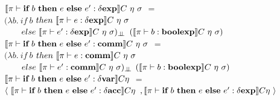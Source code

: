 $\llbracket  \pi \vdash \textbf{if} \ b \ \textbf{then} \ e \ \textbf{else} \ e': \delta \textbf{exp} \rrbracket C \ \eta \ \sigma$ 
$=$ \\
\indent \indent \indent 
$(\lambda b . \ if \ b $ $then \ \llbracket  \pi \vdash e : \delta \textbf{exp} \rrbracket C \ \eta \ \sigma$\\
\indent \indent \indent \indent \indent \ \ \ \
$else \ \llbracket  \pi \vdash e' : \delta \textbf{exp} \rrbracket C \ \eta \ \sigma)_{\bot \!\!\! \bot}$ 
$(\semBrcks{ \pi \vdash b : \boolexp}C \ \eta \ \sigma)$\\

$\llbracket  \pi \vdash \textbf{if} \ b \ \textbf{then} \ e \ \textbf{else} \ e': \textbf{comm} \rrbracket C \ \eta \ \sigma$ 
$=$ \\
\indent \indent \indent 
$(\lambda b . \ if \ b $ $then \ \semBrcks{ \pi \vdash e : \commt}C \ \eta \ \sigma$\\
\indent \indent \indent \indent \indent \ \ \ \
$else \ \llbracket  \pi \vdash e' : \textbf{comm} \rrbracket C \ \eta \ \sigma)_{\bot \!\!\! \bot}$ 
$(\semBrcks{ \pi \vdash b : \boolexp}C \ \eta \ \sigma)$\\

$\llbracket  \pi \vdash \textbf{if} \ b \ \textbf{then} \ e \ \textbf{else} \ e': \delta \textbf{var} \rrbracket C\eta$ 
$=$ \\ 
\indent \indent
$\langle \ \llbracket  \pi \vdash \textbf{if} \ b \ \textbf{then} \ e \ \textbf{else} \ e': \delta \textbf{acc} \rrbracket C\eta$
$, \llbracket  \pi \vdash \textbf{if} \ b \ \textbf{then} \ e \ \textbf{else} \ e': \delta \textbf{exp} \rrbracket C\eta \ \rangle$ \\

